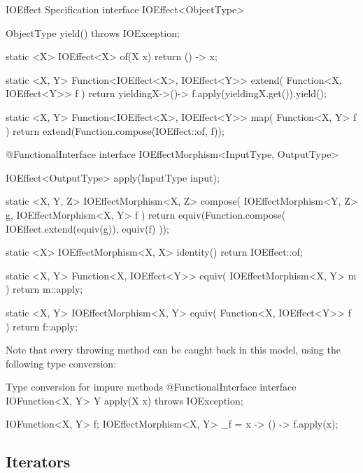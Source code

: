 \documentclass[12pt,a4paper]{report}
\renewcommand{\baselinestretch}{1.5}
\theoremstyle{theorem}
\theoremstyle{definition}
\begin{document}
\renewcommand{\baselinestretch}{1} 
\selectfont

\begin{javacode}{IOEffect Specification}
interface IOEffect<ObjectType>
{
  ObjectType yield() throws IOException;
  
  static <X> IOEffect<X> of(X x)
    { return () -> x; }
    
  static <X, Y> Function<IOEffect<X>, IOEffect<Y>> extend(
    Function<X, IOEffect<Y>> f
  )
    { return yieldingX->()-> f.apply(yieldingX.get()).yield(); }

  static <X, Y> Function<IOEffect<X>, IOEffect<Y>> map(
    Function<X, Y> f
  )
    { return extend(Function.compose(IOEffect::of, f)); }
}

@FunctionalInterface
interface IOEffectMorphism<InputType, OutputType>
{
  IOEffect<OutputType> apply(InputType input);
	
  static <X, Y, Z> IOEffectMorphism<X, Z> compose(
    IOEffectMorphism<Y, Z> g,
    IOEffectMorphism<X, Y> f
  )
    { return equiv(Function.compose(
      IOEffect.extend(equiv(g)), equiv(f)
    )); }
    
  static <X> IOEffectMorphism<X, X> identity()
    { return IOEffect::of; }
  
  static <X, Y> Function<X, IOEffect<Y>> equiv(
    IOEffectMorphism<X, Y> m
  )
    { return m::apply; }
  
  static <X, Y> IOEffectMorphism<X, Y> equiv(
    Function<X, IOEffect<Y>> f
  )
    { return f::apply; }
}
\end{javacode}

\renewcommand{\baselinestretch}{1.5} 
\selectfont

Note that every throwing method can be caught back
in this model, using the following type conversion:

\renewcommand{\baselinestretch}{1} 
\selectfont

\begin{javacode}{Type conversion for impure methods}
@FunctionalInterface
interface IOFunction<X, Y> {
  Y apply(X x) throws IOException;
}

IOFunction<X, Y> f;
IOEffectMorphism<X, Y> _f = x -> () -> f.apply(x);
\end{javacode}

\renewcommand{\baselinestretch}{1.5} 
\selectfont

\subsection{Iterators}
\end{document}
